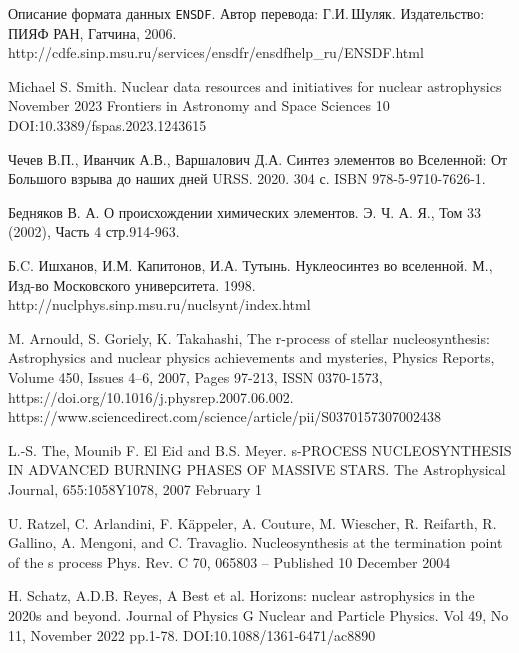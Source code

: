\documentclass[a5paper,openany]{book}
\begin{document}
\begin{thebibliography}{99}
 Описание формата данных {\tt ENSDF}. Автор перевода: Г.И.\,Шуляк. 	Издательство: ПИЯФ РАН, Гатчина, 2006. http://cdfe.sinp.msu.ru/services/ensdfr/ensdfhelp\_ru/ENSDF.html	
		
		Michael S. Smith.	Nuclear data resources and initiatives for nuclear astrophysics 	November 2023 Frontiers in Astronomy and Space Sciences 10 	DOI:10.3389/fspas.2023.1243615	
		

		Чечев В.П., Иванчик А.В., Варшалович Д.А.
		Синтез элементов во Вселенной: От Большого взрыва до наших дней
		URSS. 2020. 304 с. ISBN 978-5-9710-7626-1.

		Бедняков В. А. О происхождении химических элементов. Э. Ч. А. Я., Том 33 (2002), Часть 4 стр.914-963.

		Б.C. Ишханов, И.М. Капитонов, И.А. Тутынь. Нуклеосинтез во вселенной.
		М., Изд-во Московского университета. 1998.
		http://nuclphys.sinp.msu.ru/nuclsynt/index.html
		
		M. Arnould, S. Goriely, K. Takahashi,
		The r-process of stellar nucleosynthesis: Astrophysics and nuclear physics achievements and mysteries, Physics Reports, Volume 450, Issues 4–6, 2007, Pages 97-213, ISSN 0370-1573,
		https://doi.org/10.1016/j.physrep.2007.06.002.
		https://www.sciencedirect.com/science/article/pii/S0370157307002438
		
		L.-S. The, Mounib F. El Eid and B.S. Meyer. s-PROCESS NUCLEOSYNTHESIS IN ADVANCED BURNING PHASES OF MASSIVE STARS. The Astrophysical Journal, 655:1058Y1078, 2007 February 1
		
		U. Ratzel, C. Arlandini, F. Käppeler, A. Couture, M. Wiescher, R. Reifarth, R. Gallino, A. Mengoni, and C. Travaglio. Nucleosynthesis at the termination point of the s process Phys. Rev. C 70, 065803 – Published 10 December 2004
		
		H. Schatz, A.D.B. Reyes, A Best et al. Horizons: nuclear astrophysics in the 2020s and beyond. Journal of Physics G Nuclear and Particle Physics. Vol 49, No 11, November 2022 pp.1-78. DOI:10.1088/1361-6471/ac8890
		


\end{thebibliography}
\end{document}
